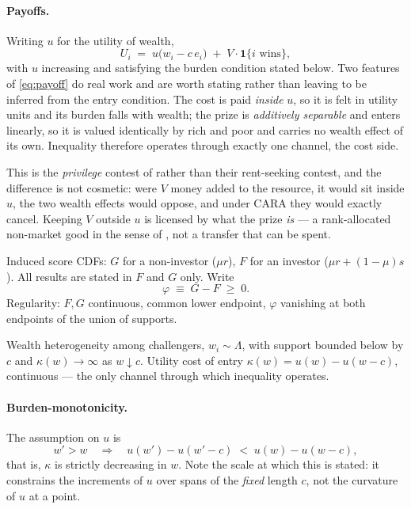 \documentclass[11pt]{article}
\begin{document}
\paragraph{Payoffs.} Writing $u$ for the utility of wealth,
\begin{equation}
  U_i \;=\; u\big(w_i - c\,e_i\big) \;+\; V\cdot\mathbf{1}\{i \text{ wins}\},
  \label{eq:payoff}
\end{equation}
with $u$ increasing and satisfying the burden condition stated below. Two
features of \eqref{eq:payoff} do real work and are worth stating rather than
leaving to be inferred from the entry condition. The cost is paid \emph{inside} $u$, so it is felt in utility
units and its burden falls with wealth; the prize is \emph{additively
separable} and enters linearly, so it is valued identically by rich and poor
and carries no wealth effect of its own. Inequality therefore operates through
exactly one channel, the cost side.

This is the \emph{privilege} contest of \citet{SchroyenTreich2016} rather than
their rent-seeking contest, and the difference is not cosmetic: were $V$
money added to the resource, it would sit inside $u$, the two wealth effects
would oppose, and under CARA they would exactly cancel. Keeping $V$ outside $u$
is licensed by what the prize \emph{is} --- a rank-allocated non-market good in
the sense of \citet{ColeMailathPostlewaite1992}, not a transfer that can be
spent.

Induced score CDFs: $G$ for a non-investor ($\mu r$), $F$ for an
investor ($\mu r+(1-\mu)s$). All results are stated in $F$ and $G$
only. Write
\[
  \varphi \;\equiv\; G-F \;\ge\;0.
\]
Regularity: $F,G$ continuous, common lower endpoint, $\varphi$
vanishing at both endpoints of the union of supports.

Wealth heterogeneity among challengers, $w_i\sim\Lambda$, with support
bounded below by $c$ and $\kappa(w)\to\infty$ as $w\downarrow c$. Utility
cost of entry $\kappa(w)=u(w)-u(w-c)$, continuous --- the only channel
through which inequality operates.

\paragraph{Burden-monotonicity.} The assumption on $u$ is
\begin{equation}
  w'>w \quad\Longrightarrow\quad u(w')-u(w'-c) \;<\; u(w)-u(w-c),
  \label{eq:burdenmono}
\end{equation}
that is, $\kappa$ is strictly decreasing in $w$. Note the scale at which this
is stated: it constrains the increments of $u$ over spans of the \emph{fixed}
length $c$, not the curvature of $u$ at a point.
\end{document}
